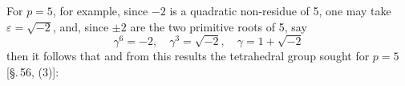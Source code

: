 For $p = 5$, for example, since $-2$ is a quadratic non-residue of 5,
one may take $\varepsilon = \sqrt{-2}$, and, since $\pm 2$ are the two
primitive roots of 5, say
\[
\gamma^6 = -2, \quad \gamma^3 = \sqrt{-2}, \quad \gamma = 1 + \sqrt{-2}
\]
then it follows that
and from this results the tetrahedral group sought for $p = 5$
[\S.\,56, (3)]:
